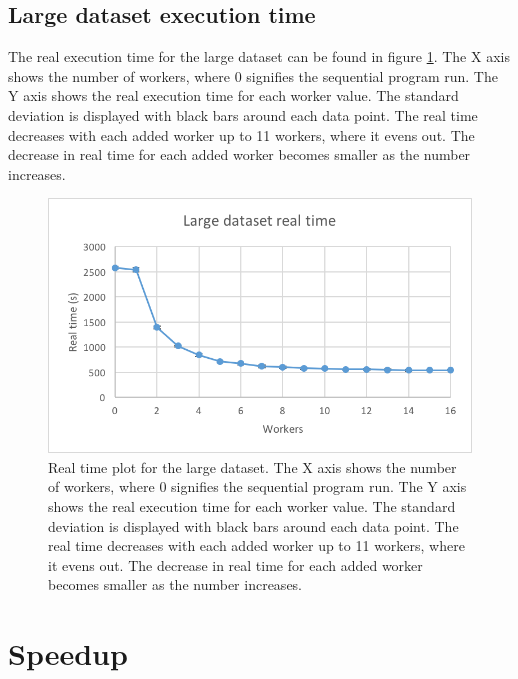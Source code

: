 \subsection{Large dataset execution time}
The real execution time for the large dataset can be found in figure \ref{fig:dataset_4_real_time}.
The X axis shows the number of workers, where 0 signifies the sequential program run.
The Y axis shows the real execution time for each worker value. The standard deviation is displayed with black bars around each data point. The real time
decreases with each added worker up to 11 workers, where it evens out. The decrease in real time for each added worker becomes smaller as the number increases.
\begin{figure}[ht]
  \centering
  \includegraphics[width=120mm]{figures/dataset_4/dataset_4_real_time.png}
  \caption[Real time plot for the large dataset.]{Real time plot for the large dataset. The X axis shows the number of workers, where 0 signifies the sequential program run.
  The Y axis shows the real execution time for each worker value. The standard deviation is displayed with black bars around each data point. The real time
  decreases with each added worker up to 11 workers, where it evens out. The decrease in real time for each added worker becomes smaller as the number increases.}
  \label{fig:dataset_4_real_time}
\end{figure}

\section{Speedup}

